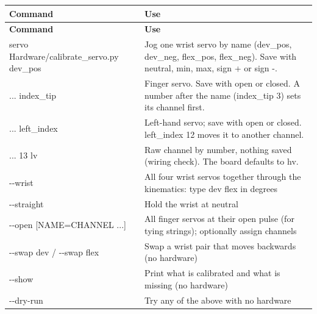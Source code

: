 \documentclass[11pt,letterpaper]{article}
\newcommand{\code}[1]{\textcolor{codeblue}{\ttfamily\smaller\relax #1}}
\begin{document}
{\small
\begin{longtable}{|>{\raggedright\arraybackslash}p{}|>{\raggedright\arraybackslash}p{}|}
\hline
\rowcolor{tblhead}\textbf{Command} & \textbf{Use} \\ \hline
\endfirsthead
\hline
\rowcolor{tblhead}\textbf{Command} & \textbf{Use} \\ \hline
\endhead
\code{servo Hardware/\allowbreak{}calibrate\_\allowbreak{}servo.py dev\_\allowbreak{}pos} & Jog one wrist servo by name (\code{dev\_\allowbreak{}pos}, \code{dev\_\allowbreak{}neg}, \code{flex\_\allowbreak{}pos}, \code{flex\_\allowbreak{}neg}). Save with \code{neutral}, \code{min}, \code{max}, \code{sign +} or \code{sign -{}}. \\ \hline
\code{... index\_\allowbreak{}tip} & Finger servo. Save with \code{open} or \code{closed}. A number after the name (\code{index\_\allowbreak{}tip 3}) sets its channel first. \\ \hline
\code{... left\_\allowbreak{}index} & Left-hand servo; save with \code{open} or \code{closed}. \code{left\_\allowbreak{}index 12} moves it to another channel. \\ \hline
\code{... 13 lv} & Raw channel by number, nothing saved (wiring check). The board defaults to \code{hv}. \\ \hline
\code{-{}-{}wrist} & All four wrist servos together through the kinematics: type \code{dev flex} in degrees \\ \hline
\code{-{}-{}straight} & Hold the wrist at neutral \\ \hline
\code{-{}-{}open [NAME=\allowbreak{}CHANNEL ...]} & All finger servos at their open pulse (for tying strings); optionally assign channels \\ \hline
\code{-{}-{}swap dev} / \code{-{}-{}swap flex} & Swap a wrist pair that moves backwards (no hardware) \\ \hline
\code{-{}-{}show} & Print what is calibrated and what is missing (no hardware) \\ \hline
\code{-{}-{}dry-{}\allowbreak{}run} & Try any of the above with no hardware \\ \hline
\end{longtable}}
\end{document}
